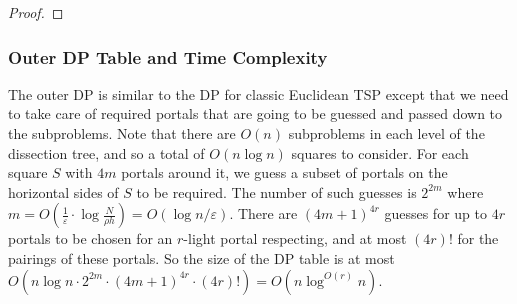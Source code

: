 \documentclass[10pt,a4paper]{amsart}
\theoremstyle{thmstyleone}
\newcommand{\eps}{\varepsilon}
\newcommand{\opt}{{\text{opt}}}
\begin{document}
\begin{proof}

\end{proof}

\subsubsection*{Outer DP Table and Time Complexity} 

The outer DP is similar to the DP for classic Euclidean TSP except that we need to
take care of required portals that are going to be guessed and passed down to the subproblems.
Note that there are $O(n)$ subproblems in each level of the dissection tree, and so a total of $O(n\log n)$
squares to consider.
For each square $S$ with $4m$ portals around it, we guess a subset of portals on the horizontal sides of $S$
to be required. The number of such guesses is $2^{2m}$ where $m=O(\frac{1}{\eps}\cdot\log\frac{N}{\rho h})=O(\log n/\eps)$.
There are $(4m+1)^{4r}$ guesses for up to $4r$ portals to be chosen for an $r$-light portal respecting, and
at most $(4r)!$ for the pairings of these portals.
So the size of the DP table  is at most $O(n\log n\cdot 2^{2m}\cdot (4m+1)^{4r}\cdot (4r)!)=O(n\log^{O(r)} n)$.
\end{document}
